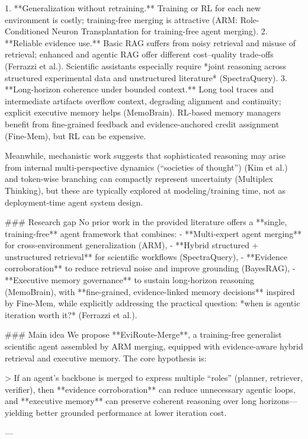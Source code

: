 1. **Generalization without retraining.** Training or RL for each new environment is costly; training-free merging is attractive (ARM: Role-Conditioned Neuron Transplantation for training-free agent merging).  
2. **Reliable evidence use.** Basic RAG suffers from noisy retrieval and misuse of retrieval; enhanced and agentic RAG offer different cost–quality trade-offs (Ferrazzi et al.). Scientific assistants especially require *joint reasoning across structured experimental data and unstructured literature* (SpectraQuery).  
3. **Long-horizon coherence under bounded context.** Long tool traces and intermediate artifacts overflow context, degrading alignment and continuity; explicit executive memory helps (MemoBrain). RL-based memory managers benefit from fine-grained feedback and evidence-anchored credit assignment (Fine-Mem), but RL can be expensive.

Meanwhile, mechanistic work suggests that sophisticated reasoning may arise from internal multi-perspective dynamics (“societies of thought”) (Kim et al.) and token-wise branching can compactly represent uncertainty (Multiplex Thinking), but these are typically explored at modeling/training time, not as deployment-time agent system design.

### Research gap  
No prior work in the provided literature offers a **single, training-free** agent framework that combines:
- **Multi-expert agent merging** for cross-environment generalization (ARM),
- **Hybrid structured + unstructured retrieval** for scientific workflows (SpectraQuery),
- **Evidence corroboration** to reduce retrieval noise and improve grounding (BayesRAG),
- **Executive memory governance** to sustain long-horizon reasoning (MemoBrain), with **fine-grained, evidence-linked memory decisions** inspired by Fine-Mem,
while explicitly addressing the practical question: *when is agentic iteration worth it?* (Ferrazzi et al.).

### Main idea  
We propose **EviRoute-Merge**, a training-free generalist scientific agent assembled by ARM merging, equipped with evidence-aware hybrid retrieval and executive memory. The core hypothesis is:

> If an agent’s backbone is merged to express multiple “roles” (planner, retriever, verifier), then **evidence corroboration** can reduce unnecessary agentic loops, and **executive memory** can preserve coherent reasoning over long horizons—yielding better grounded performance at lower iteration cost.

---

